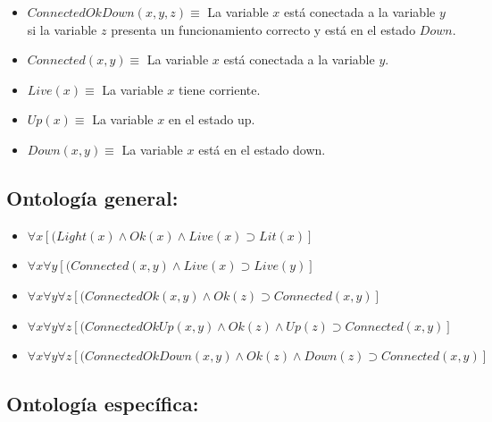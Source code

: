 \documentclass[10pt, a4paper,spanish]{article}
\begin{document}
\begin{itemize}
\begin{itemize}
					\item $ConnectedOkDown(x, y, z) \equiv$ La variable $x$ está conectada a la variable $y$ si la variable $z$ presenta un funcionamiento correcto y está en el estado $Down$.
					\item $Connected(x, y) \equiv$ La variable $x$ está conectada a la variable $y$.
					\item $Live(x) \equiv$ La variable $x$ tiene corriente.
					\item $Up(x) \equiv$ La variable $x$ en el estado up.
					\item $Down(x, y) \equiv$ La variable $x$ está en el estado down.
				\end{itemize}
			\end{itemize}

		\subsection{Ontología general:}

			\begin{itemize}
				\item $ \forall x [(Light(x) \land Ok(x) \land Live(x) \supset Lit(x)] $
				\item $ \forall x \forall y [(Connected(x, y) \land Live(x) \supset Live(y)] $
				\item $ \forall x \forall y \forall z [(ConnectedOk(x, y) \land Ok(z) \supset Connected(x, y)] $
				\item $ \forall x \forall y \forall z [(ConnectedOkUp(x, y) \land Ok(z) \land Up(z) \supset Connected(x, y)] $
				\item $ \forall x \forall y \forall z [(ConnectedOkDown(x, y) \land Ok(z) \land Down(z) \supset Connected(x, y)] $

			\end{itemize}

		\subsection{Ontología específica:}
\end{document}
